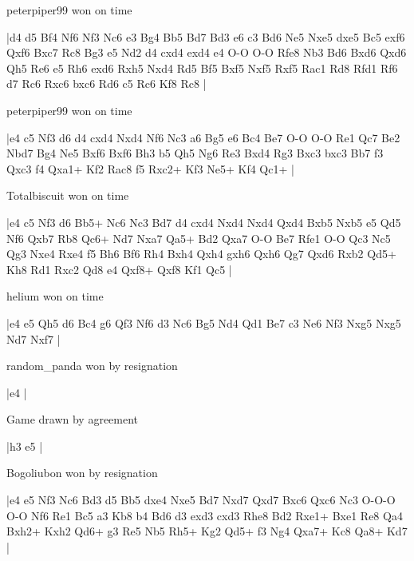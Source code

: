 \showboard

peterpiper99 won on time

\makegametitle
|d4 d5 Bf4 Nf6 Nf3 Nc6 e3 Bg4 Bb5 Bd7 Bd3 e6 c3 Bd6 Ne5 Nxe5 dxe5 Bc5 exf6 Qxf6 Bxc7 Rc8 Bg3 e5 Nd2 d4 cxd4 exd4 e4 O-O O-O Rfe8 Nb3 Bd6 Bxd6 Qxd6 Qh5 Re6 e5 Rh6 exd6 Rxh5 Nxd4 Rd5 Bf5 Bxf5 Nxf5 Rxf5 Rac1 Rd8 Rfd1 Rf6 d7 Rc6 Rxc6 bxc6 Rd6 c5 Rc6 Kf8 Rc8  |

\showboard

peterpiper99 won on time

\makegametitle
|e4 c5 Nf3 d6 d4 cxd4 Nxd4 Nf6 Nc3 a6 Bg5 e6 Bc4 Be7 O-O O-O Re1 Qc7 Be2 Nbd7 Bg4 Ne5 Bxf6 Bxf6 Bh3 b5 Qh5 Ng6 Re3 Bxd4 Rg3 Bxc3 bxc3 Bb7 f3 Qxc3 f4 Qxa1+ Kf2 Rac8 f5 Rxc2+ Kf3 Ne5+ Kf4 Qc1+  |

\showboard

Totalbiscuit won on time

\makegametitle
|e4 c5 Nf3 d6 Bb5+ Nc6 Nc3 Bd7 d4 cxd4 Nxd4 Nxd4 Qxd4 Bxb5 Nxb5 e5 Qd5 Nf6 Qxb7 Rb8 Qc6+ Nd7 Nxa7 Qa5+ Bd2 Qxa7 O-O Be7 Rfe1 O-O Qc3 Nc5 Qg3 Nxe4 Rxe4 f5 Bh6 Bf6 Rh4 Bxh4 Qxh4 gxh6 Qxh6 Qg7 Qxd6 Rxb2 Qd5+ Kh8 Rd1 Rxc2 Qd8 e4 Qxf8+ Qxf8 Kf1 Qc5  |

\showboard

helium won on time

\makegametitle
|e4 e5 Qh5 d6 Bc4 g6 Qf3 Nf6 d3 Nc6 Bg5 Nd4 Qd1 Be7 c3 Ne6 Nf3 Nxg5 Nxg5 Nd7 Nxf7  |

\showboard

random\_panda won by resignation

\makegametitle
|e4  |

\showboard

Game drawn by agreement

\makegametitle
|h3 e5  |

\showboard

Bogoliubon won by resignation

\makegametitle
|e4 e5 Nf3 Nc6 Bd3 d5 Bb5 dxe4 Nxe5 Bd7 Nxd7 Qxd7 Bxc6 Qxc6 Nc3 O-O-O O-O Nf6 Re1 Bc5 a3 Kb8 b4 Bd6 d3 exd3 cxd3 Rhe8 Bd2 Rxe1+ Bxe1 Re8 Qa4 Bxh2+ Kxh2 Qd6+ g3 Re5 Nb5 Rh5+ Kg2 Qd5+ f3 Ng4 Qxa7+ Kc8 Qa8+ Kd7  |


